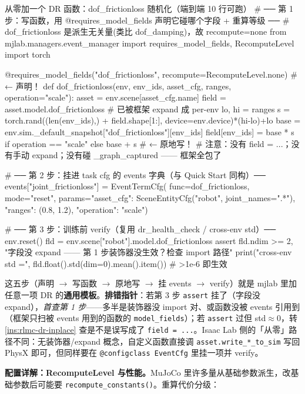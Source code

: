 \begin{codebox}[Python]{从零加一个 DR 函数：dof\_frictionloss 随机化（端到端 10 行可跑）}
# ── 第 1 步：写函数，用 @requires_model_fields 声明它碰哪个字段 + 重算等级 ──
#    dof_frictionloss 是派生无关量(类比 dof_damping)，故 recompute=none
from mjlab.managers.event_manager import requires_model_fields, RecomputeLevel
import torch

@requires_model_fields("dof_frictionloss", recompute=RecomputeLevel.none)  # ← 声明！
def dof_frictionloss(env, env_ids, asset_cfg, ranges, operation="scale"):
    asset = env.scene[asset_cfg.name]
    field = asset.model.dof_frictionloss            # 已被框架 expand 成 per-env
    lo, hi = ranges
    s = torch.rand((len(env_ids),) + field.shape[1:], device=env.device)*(hi-lo)+lo
    base = env.sim._default_snapshot["dof_frictionloss"][env_ids]
    field[env_ids] = base * s if operation == "scale" else base + s   # ← 原地写！
    # 注意：没有 field = ...；没有手动 expand；没有碰 _graph_captured —— 框架全包了

# ── 第 2 步：挂进 task cfg 的 events 字典（与 Quick Start 同构）──
events["joint_frictionloss"] = EventTermCfg(
    func=dof_frictionloss, mode="reset",
    params={"asset_cfg": SceneEntityCfg("robot", joint_names=".*"),
            "ranges": (0.8, 1.2), "operation": "scale"})

# ── 第 3 步：训练前 verify（复用 dr_health_check / cross-env std）──
env.reset()
fld = env.scene["robot"].model.dof_frictionloss
assert fld.ndim >= 2, "字段没 expand —— 第 1 步装饰器没生效？检查 import 路径"
print("cross-env std =", fld.float().std(dim=0).mean().item())   # >1e-6 即生效
\end{codebox}

\noindent{}这五步（声明 $\to$ 写函数 $\to$ 原地写 $\to$ 挂 events $\to$ verify）就是 mjlab 里加任意一项 DR 的\textbf{通用模板}。\textbf{排错指针}：若第 3 步 \verb|assert| 挂了（字段没 expand），\emph{首查第 1 步}——多半是装饰器没 import 对、或函数没被 events 引用到（框架只扫被 events 用到的函数的 \verb|model_fields|）；若 \verb|assert| 过但 std$\approx 0$，转 \cref{ins:rlmc-dr-inplace} 查是不是误写成了 \verb|field = ...|。Isaac Lab 侧的「从零」路径不同：无装饰器/expand 概念，自定义函数直接调 \verb|asset.write_*_to_sim| 写回 PhysX 即可，但同样要在 \verb|@configclass EventCfg| 里挂一项并 verify。

\textbf{配置详解：RecomputeLevel 与性能。}MuJoCo 里许多量从基础参数派生，改基础参数后可能要 \verb|recompute_constants()|。重算代价分级：

